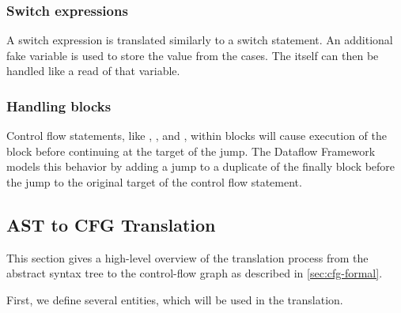 
\subsubsection{Switch expressions}
\label{sec:switch-expr}

A switch expression is translated similarly to a switch statement.
An additional fake variable  is used to store the value
from the cases. The  itself can then be
handled like a read of that variable.


\subsubsection{Handling  blocks}
\label{sec:try-finally}

Control flow statements, like , , and ,
within  blocks will cause execution of the  block before
continuing at the target of the jump. The Dataflow Framework models this
behavior by adding a jump to a duplicate of the finally block before the
jump to the original target of the control flow statement.


\subsection{AST to CFG Translation}
\label{sec:ast_to_cfg_translation}

This section gives a high-level overview of the translation process
from the abstract syntax tree to the control-flow graph as described
in \autoref{sec:cfg-formal}.

First, we define several entities, which will be used in the translation.

